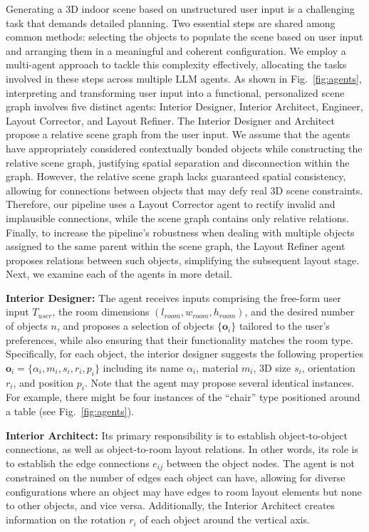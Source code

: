 \documentclass[runningheads]{llncs}
\begin{document}
Generating a 3D indoor scene based on unstructured user input is a challenging task that demands detailed planning. 
Two essential steps are shared among common methods: selecting the objects to populate the scene based on user input and arranging them in a meaningful and coherent configuration. 
We employ a multi-agent approach to tackle this complexity effectively, allocating the tasks involved in these steps across multiple LLM agents. 
As shown in Fig.~\ref{fig:agents}, interpreting and transforming user input into a functional, personalized scene graph involves five distinct agents: Interior Designer, Interior Architect, Engineer, Layout Corrector, and Layout Refiner. 
The Interior Designer and Architect propose a relative scene graph from the user input. We assume that the agents have appropriately considered contextually bonded objects while constructing the relative scene graph, justifying spatial separation and disconnection within the graph. 
However, the relative scene graph lacks guaranteed spatial consistency, allowing for connections between objects that may defy real 3D scene constraints.
Therefore, our pipeline uses a Layout Corrector agent to rectify invalid and implausible connections, while the scene graph contains only relative relations.
Finally, to increase the pipeline's robustness when dealing with multiple objects assigned to the same parent within the scene graph, the Layout Refiner agent proposes relations between such objects, simplifying the subsequent layout stage. Next, we examine each of the agents in more detail.



\textbf{Interior Designer:} 
The agent receives inputs comprising the free-form user input $T_{user}$, the room dimensions $(l_{room}, w_{room}, h_{room})$, and the desired number of objects $n$, and proposes a selection of objects $\{\mathbf{o}_i\}$ tailored to the user's preferences, while also ensuring that their functionality matches the room type. 
Specifically, for each object, the interior designer suggests the following properties
$\mathbf{o}_i = \{\alpha_i, m_i, s_i, r_i, p_i\}$ including its name $\alpha_i$, material $m_i$, 3D size $s_i$, orientation $r_i$, and position $p_i$. 
Note that the agent may propose several identical instances. 
For example, there might be four instances of the ``chair'' type positioned around a table (see Fig.~\ref{fig:agents}).

\textbf{Interior Architect:} 
Its primary responsibility is to establish object-to-object connections, as well as object-to-room layout relations. 
In other words, its role is to establish the edge connections $e_{ij}$ between the object nodes. 
The agent is not constrained on the number of edges each object can have, allowing for diverse configurations where an object may have edges to room layout elements but none to other objects, and vice versa. 
Additionally, the Interior Architect creates information on the rotation $r_i$ of each object around the vertical axis. 
\end{document}
